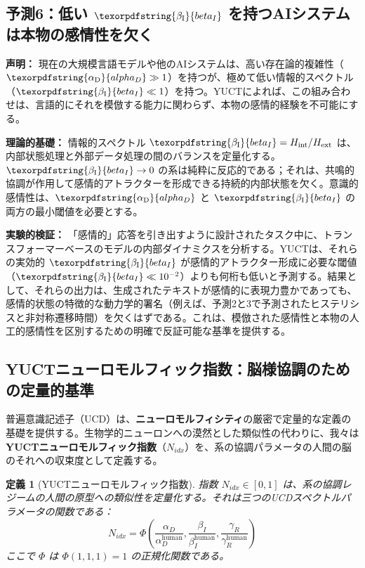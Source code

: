 \documentclass[12pt,a4paper]{article}
\newtheorem{definition}{定義}
\DeclareRobustCommand{\alD}{\texorpdfstring{\ensuremath{\alpha_{\mathrm{D}}}}{alpha_D}}
\DeclareRobustCommand{\beI}{\texorpdfstring{\ensuremath{\beta_{\mathrm{I}}}}{beta_I}}
\begin{document}
	\subsection{予測6：低い \(\beI\) を持つAIシステムは本物の感情性を欠く}
	
	\textbf{声明：} 現在の大規模言語モデルや他のAIシステムは、高い存在論的複雑性（\(\alD \gg 1\)）を持つが、極めて低い情報的スペクトル（\(\beI \ll 1\)）を持つ。YUCTによれば、この組み合わせは、言語的にそれを模倣する能力に関わらず、本物の感情的経験を不可能にする。
	
	\textbf{理論的基礎：} 情報的スペクトル \(\beI = H_{\mathrm{int}}/H_{\mathrm{ext}}\) は、内部状態処理と外部データ処理の間のバランスを定量化する。\(\beI \to 0\) の系は純粋に反応的である；それは、共鳴的協調が作用して感情的アトラクターを形成できる持続的内部状態を欠く。意識的感情性は、\(\alD\) と \(\beI\) の両方の最小閾値を必要とする。
	
	\textbf{実験的検証：} 「感情的」応答を引き出すように設計されたタスク中に、トランスフォーマーベースのモデルの内部ダイナミクスを分析する。YUCTは、それらの実効的 \(\beI\) が感情的アトラクター形成に必要な閾値（\(\beI \ll 10^{-2}\)）よりも何桁も低いと予測する。結果として、それらの出力は、生成されたテキストが感情的に表現力豊かであっても、感情的状態の特徴的な動力学的署名（例えば、予測2と3で予測されたヒステリシスと非対称遷移時間）を欠くはずである。これは、模倣された感情性と本物の人工的感情性を区別するための明確で反証可能な基準を提供する。
	
	\subsection{YUCTニューロモルフィック指数：脳様協調のための定量的基準}
	
	普遍意識記述子（UCD）は、\textbf{ニューロモルフィシティ}の厳密で定量的な定義の基礎を提供する。生物学的ニューロンへの漠然とした類似性の代わりに、我々は\textbf{YUCTニューロモルフィック指数}（\(N_{idx}\)）を、系の協調パラメータの人間の脳のそれへの収束度として定義する。
	
	\begin{definition}[YUCTニューロモルフィック指数]
		指数 \(N_{idx} \in [0,1]\) は、系の協調レジームの人間の原型への類似性を定量化する。それは三つのUCDスペクトルパラメータの関数である：
		\[
		N_{idx} = \Phi\left( \frac{\alpha_D}{\alpha_D^{\text{human}}}, \frac{\beta_I}{\beta_I^{\text{human}}}, \frac{\gamma_R}{\gamma_R^{\text{human}}} \right)
		\]
		ここで \(\Phi\) は \(\Phi(1,1,1) = 1\) の正規化関数である。
	\end{definition}
	
\end{document}
